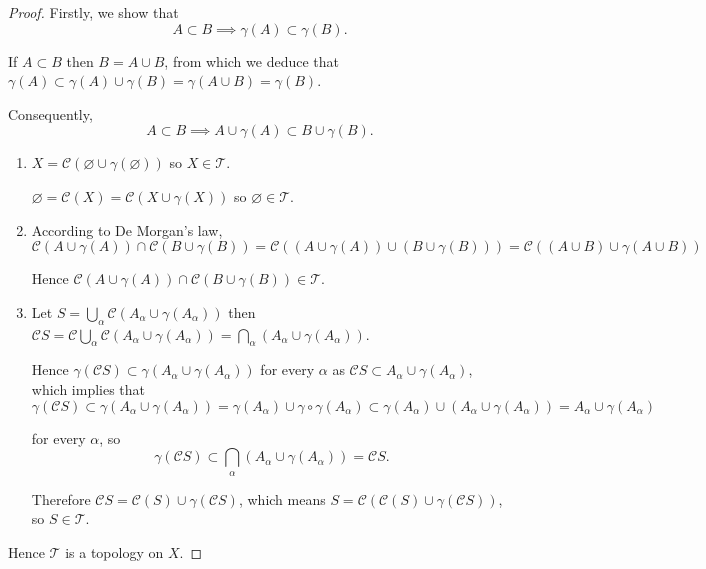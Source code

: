 \begin{proof}
	Firstly, we show that
	\[
		A \subset B \implies \gamma(A) \subset \gamma(B).
	\]

	If \( A \subset B \) then \( B = A \cup B \), from which we deduce that \( \gamma(A) \subset \gamma(A) \cup \gamma(B) = \gamma(A \cup B) = \gamma(B) \).

	Consequently,
	\[ A \subset B \implies A \cup \gamma(A) \subset B \cup \gamma(B). \]

	\begin{enumerate}[label={(\roman*)}]
		\item \( X = \mathscr{C}(\varnothing \cup \gamma(\varnothing)) \) so \( X \in \mathscr{T} \).

		      \( \varnothing = \mathscr{C}(X) = \mathscr{C}(X \cup \gamma(X)) \) so \( \varnothing \in \mathscr{T} \).
		\item According to De Morgan's law,
		      \[  \mathscr{C}(A \cup \gamma(A)) \cap \mathscr{C}(B \cup \gamma(B)) = \mathscr{C}((A \cup \gamma(A)) \cup (B \cup \gamma(B))) = \mathscr{C}((A \cup B) \cup \gamma(A \cup B)) \]

		      Hence \(\mathscr{C}(A \cup \gamma(A)) \cap \mathscr{C}(B \cup \gamma(B)) \in \mathscr{T}\).
		\item Let \( S = \bigcup_{\alpha} \mathscr{C}(A_{\alpha} \cup \gamma(A_{\alpha})) \) then \( \mathscr{C}S = \mathscr{C}\bigcup_{\alpha} \mathscr{C}(A_{\alpha} \cup \gamma(A_{\alpha})) = \bigcap_{\alpha}(A_{\alpha} \cup \gamma(A_{\alpha})) \).

		      Hence \( \gamma(\mathscr{C}S) \subset \gamma(A_{\alpha} \cup \gamma(A_{\alpha})) \) for every \( \alpha \) as \( \mathscr{C}S \subset A_{\alpha} \cup \gamma(A_{\alpha}) \), which implies that
		      \[
			      \gamma(\mathscr{C}S) \subset \gamma(A_{\alpha} \cup \gamma(A_{\alpha})) = \gamma(A_{\alpha}) \cup \gamma\circ\gamma(A_{\alpha}) \subset \gamma(A_{\alpha}) \cup (A_{\alpha} \cup \gamma(A_{\alpha})) = A_{\alpha} \cup \gamma(A_{\alpha})
		      \]

		      for every \(\alpha\), so
		      \[
			      \gamma(\mathscr{C}S) \subset \bigcap_{\alpha} (A_{\alpha} \cup \gamma(A_{\alpha})) = \mathscr{C}S.
		      \]

		      Therefore \( \mathscr{C}S = \mathscr{C}(S) \cup \gamma(\mathscr{C}S) \), which means \( S = \mathscr{C}(\mathscr{C}(S) \cup \gamma(\mathscr{C}S)) \), so \( S \in \mathscr{T} \).
	\end{enumerate}

	Hence \( \mathscr{T} \) is a topology on \(X\).


\end{proof}
